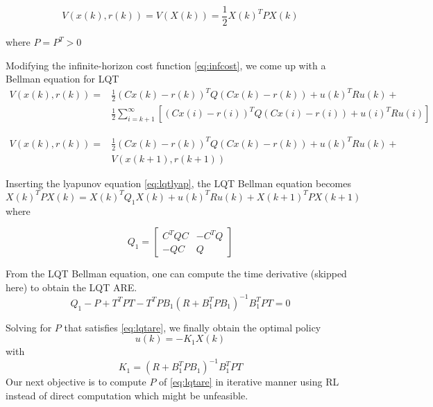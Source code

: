 \begin{equation}
\label{eq:lqtlyap}
V(x(k), r(k)) = V(X(k)) = \frac{1}{2}X(k)^TPX(k)
\end{equation}

where $ P = P^T > 0 $

Modifying the infinite-horizon cost function \eqref{eq:infcost}, we come up with a Bellman equation for LQT
\begin{equation}
\begin{split}
V(x(k), r(k)) = &\frac{1}{2} (Cx(k)-r(k))^TQ(Cx(k)-r(k)) + u(k)^TRu(k) + \\
&\frac{1}{2} \sum_{i=k+1}^{\infty} \left[ (Cx(i)-r(i))^TQ(Cx(i)-r(i)) + u(i)^TRu(i)\right] 
\end{split}
\end{equation}

\begin{equation}
\begin{split}
V(x(k), r(k)) = &\frac{1}{2} (Cx(k)-r(k))^TQ(Cx(k)-r(k)) + u(k)^TRu(k) + \\
& V(x(k+1), r(k+1))
\end{split}
\end{equation}

Inserting the lyapunov equation \eqref{eq:lqtlyap}, the LQT Bellman equation becomes
\begin{equation}
\label{eq:lqtbellman}
X(k)^TPX(k) =  X(k)^TQ_1X(k) + u(k)^TRu(k) + X(k+1)^TPX(k+1)
\end{equation}
where

\begin{equation}
Q_1 = \left[ \begin{array}{cc}
C^TQC & -C^TQ \\ 
-QC & Q
\end{array} \right] 
\end{equation}

From the LQT Bellman equation, one can compute the time derivative (skipped here) to obtain the LQT ARE.
\begin{equation}
\label{eq:lqtare}
Q_1 - P + T^TPT - T^TPB_1(R+B_1^TPB_1)^{-1}B_1^TPT = 0
\end{equation}

Solving for $P$ that satisfies \eqref{eq:lqtare}, we finally obtain the optimal policy 
\begin{equation}
\label{eq:opt_u}
u(k) = -K_1X(k)
\end{equation}
with
\begin{equation}
K_1 = (R+B_1^TPB_1)^{-1}B_1^TPT
\end{equation}
Our next objective is to compute $P$ of \eqref{eq:lqtare} in iterative manner using \ac {RL} instead of direct computation which might be unfeasible. 


